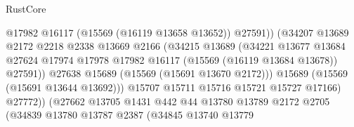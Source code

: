 \begin{lexlean}{RustCore}
\begin{coremodule}
                                              @17982
                                              @16117
                                              (@15569 (@16119 @13658 @13652))
                                              @27591))
                                          (@34207
                                            @13689
                                            @2172
                                            @2218
                                            @2338
                                            @13669
                                            @2166
                                            (@34215
                                              @13689
                                              (@34221
                                                @13677
                                                @13684
                                                @27624
                                                @17974
                                                @17978
                                                @17982
                                                @16117
                                                (@15569 (@16119 @13684 @13678))
                                                @27591))
                                            @27638
                                            @15689
                                            (@15569 (@15691 @13670 @2172)))
                                          @15689
                                          (@15569 (@15691 @13644 @13692)))
                                        @15707
                                        @15711
                                        @15716
                                        @15721
                                        @15727
                                        @17166)
                                      @27772))
                                  (@27662
                                    @13705
                                    @1431
                                    @442
                                    @44
                                    @13780
                                    @13789
                                    @2172
                                    @2705
                                    (@34839
                                      @13780
                                      @13787
                                      @2387
                                      (@34845
                                        @13740
                                        @13779

\end{coremodule}
\end{lexlean}
